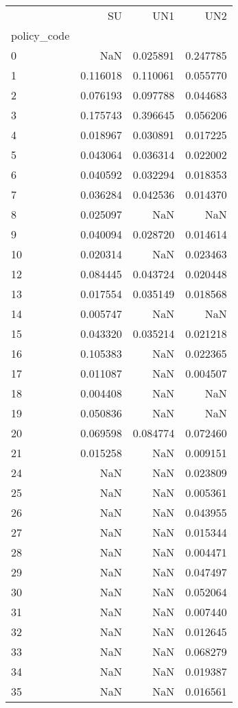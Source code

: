 \begin{tabular}{lrrr}
\toprule
{} &        SU &       UN1 &       UN2 \\
policy\_code &           &           &           \\
\midrule
0           &       NaN &  0.025891 &  0.247785 \\
1           &  0.116018 &  0.110061 &  0.055770 \\
2           &  0.076193 &  0.097788 &  0.044683 \\
3           &  0.175743 &  0.396645 &  0.056206 \\
4           &  0.018967 &  0.030891 &  0.017225 \\
5           &  0.043064 &  0.036314 &  0.022002 \\
6           &  0.040592 &  0.032294 &  0.018353 \\
7           &  0.036284 &  0.042536 &  0.014370 \\
8           &  0.025097 &       NaN &       NaN \\
9           &  0.040094 &  0.028720 &  0.014614 \\
10          &  0.020314 &       NaN &  0.023463 \\
12          &  0.084445 &  0.043724 &  0.020448 \\
13          &  0.017554 &  0.035149 &  0.018568 \\
14          &  0.005747 &       NaN &       NaN \\
15          &  0.043320 &  0.035214 &  0.021218 \\
16          &  0.105383 &       NaN &  0.022365 \\
17          &  0.011087 &       NaN &  0.004507 \\
18          &  0.004408 &       NaN &       NaN \\
19          &  0.050836 &       NaN &       NaN \\
20          &  0.069598 &  0.084774 &  0.072460 \\
21          &  0.015258 &       NaN &  0.009151 \\
24          &       NaN &       NaN &  0.023809 \\
25          &       NaN &       NaN &  0.005361 \\
26          &       NaN &       NaN &  0.043955 \\
27          &       NaN &       NaN &  0.015344 \\
28          &       NaN &       NaN &  0.004471 \\
29          &       NaN &       NaN &  0.047497 \\
30          &       NaN &       NaN &  0.052064 \\
31          &       NaN &       NaN &  0.007440 \\
32          &       NaN &       NaN &  0.012645 \\
33          &       NaN &       NaN &  0.068279 \\
34          &       NaN &       NaN &  0.019387 \\
35          &       NaN &       NaN &  0.016561 \\
\bottomrule
\end{tabular}
